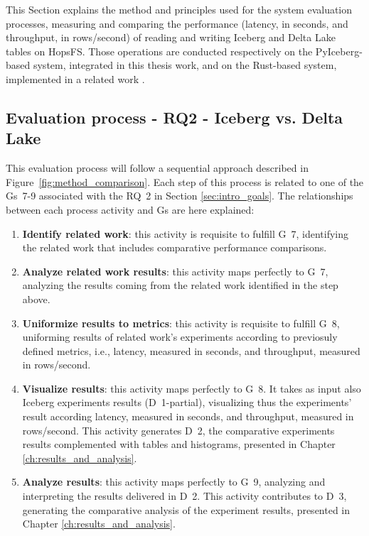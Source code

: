 This Section explains the method and principles used for the system evaluation processes, measuring and comparing the performance (latency, in seconds, and throughput, in rows/second) of reading and writing Iceberg and Delta Lake tables on \gls{HopsFS}. Those operations are conducted respectively on the PyIceberg-based system, integrated in this thesis work, and on the Rust-based system, implemented in a related work \cite{manfrediReducingReadWrite2024}.

\subsection{Evaluation process - RQ2 - Iceberg vs. Delta Lake}
\label{subsec:ystem_eval_iceberg_delta}
This evaluation process will follow a sequential approach described in Figure~\ref{fig:method_comparison}. Each step of this process is related to one of the \glspl{G}~7-9 associated with the \gls{RQ}~2 in Section \ref{sec:intro_goals}. The relationships between each process activity and \glspl{G} are here explained:
\begin{enumerate}
    \item \textbf{Identify related work}: this activity is requisite to fulfill \gls{G}~7, identifying the related work that includes comparative performance comparisons.
    \item \textbf{Analyze related work results}: this activity maps perfectly to \gls{G}~7, analyzing the results coming from the related work identified in the step above.
    \item \textbf{Uniformize results to metrics}: this activity is requisite to fulfill \gls{G}~8, uniforming results of related work's experiments according to previosuly defined metrics, i.e., latency, measured in seconds, and throughput, measured  in rows/second.
    \item \textbf{Visualize results}: this activity maps perfectly to \gls{G}~8. It takes as input also Iceberg experiments results (\gls{D}~1-partial), visualizing thus the experiments' result according latency, measured in seconds, and throughput, measured in rows/second. This activity generates \gls{D}~2, the comparative experiments results complemented with tables and histograms, presented in Chapter \ref{ch:results_and_analysis}.
    \item \textbf{Analyze results}: this activity maps perfectly to \gls{G}~9, analyzing and interpreting the results delivered in \gls{D}~2. This activity contributes to \gls{D}~3, generating the comparative analysis of the experiment results, presented in Chapter \ref{ch:results_and_analysis}.
\end{enumerate}
